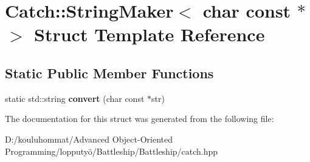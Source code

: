 \hypertarget{struct_catch_1_1_string_maker_3_01char_01const_01_5_01_4}{}\section{Catch\+:\+:String\+Maker$<$ char const $\ast$ $>$ Struct Template Reference}
\label{struct_catch_1_1_string_maker_3_01char_01const_01_5_01_4}
\subsection*{Static Public Member Functions}
\begin{DoxyCompactItemize}
\item 
\mbox{\label{struct_catch_1_1_string_maker_3_01char_01const_01_5_01_4_a20813965ad59cdf6d1f874f47158432d}} 
static std\+::string {\bfseries convert} (char const $\ast$str)
\end{DoxyCompactItemize}


The documentation for this struct was generated from the following file\+:\begin{DoxyCompactItemize}
\item 
D\+:/kouluhommat/\+Advanced Object-\/\+Oriented Programming/lopputyö/\+Battleship/\+Battleship/catch.\+hpp\end{DoxyCompactItemize}
